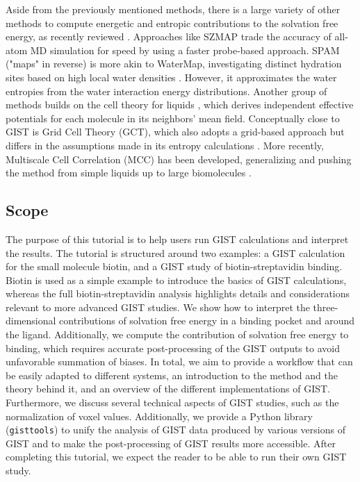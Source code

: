 \documentclass[9pt,tutorial,pubversion]{livecoms}
\newcommand{\software}{\texttt}
\begin{document}
Aside from the previously mentioned methods, there is a large variety of other methods to compute energetic and entropic contributions to the solvation free energy, as recently reviewed \cite{Heyden2019-localsolvation,Mukherjee2022-ReviewSpatialWatersBiomolecule}.
Approaches like SZMAP \cite{Bayden2015-SZMAP} trade the accuracy of all-atom MD simulation for speed by using a faster probe-based approach.
SPAM ("maps" in reverse) is more akin to WaterMap, investigating distinct hydration sites based on high local water densities \cite{Cui2013-SPAM}. 
However, it approximates the water entropies from the water interaction energy distributions.
Another group of methods builds on the cell theory for liquids \cite{henchman2003partition}, which derives independent effective potentials for each molecule in its neighbors' mean field.
Conceptually close to GIST is Grid Cell Theory (GCT), which also adopts a grid-based approach but differs in the assumptions made in its entropy calculations \cite{Gerogiokas2014-GCT}.
More recently, Multiscale Cell Correlation (MCC) has been developed, generalizing and pushing the method from simple liquids up to large biomolecules \cite{henchman2007free, Hensen2014, Ali2021-hc, Kalayan2022-MCCBiomol}. 

\subsection{Scope}
The purpose of this tutorial is to help users run GIST calculations and interpret the results.
The tutorial is structured around two examples: a GIST calculation for the small molecule biotin, and a GIST study of biotin-streptavidin binding. 
Biotin is used as a simple example to introduce the basics of GIST calculations, whereas the full biotin-streptavidin analysis highlights details and considerations relevant to more advanced GIST studies.
We show how to interpret the three-dimensional contributions of solvation free energy in a binding pocket and around the ligand.
Additionally, we compute the contribution of solvation free energy to binding, which requires accurate post-processing of the GIST outputs to avoid unfavorable summation of biases.
In total, we aim to provide a workflow that can be easily adapted to different systems, an introduction to the method and the theory behind it, and an overview of the different implementations of GIST.\\
Furthermore, we discuss several technical aspects of GIST studies, such as the normalization of voxel values. 
Additionally, we provide a Python library (\software{gisttools}) to unify the analysis of GIST data produced by various versions of GIST and to make the post-processing of GIST results more accessible.
After completing this tutorial, we expect the reader to be able to run their own GIST study. 
\end{document}
